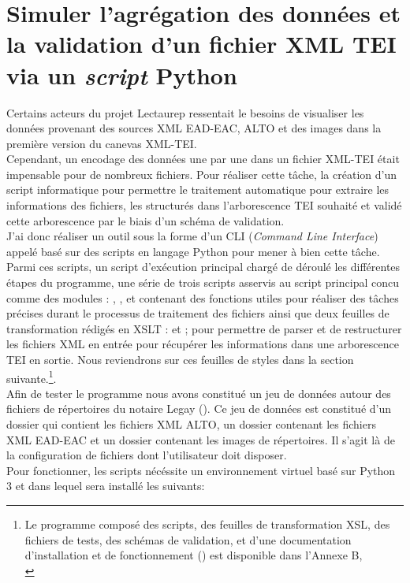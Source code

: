 \section{Simuler l'agrégation des données et la validation d'un fichier XML TEI via un \textit{script} Python}

Certains acteurs du projet Lectaurep ressentait le besoins de visualiser les données provenant des sources XML EAD-EAC, ALTO et des images dans la première version du canevas XML-TEI.\\

Cependant, un encodage  des données une par une dans un fichier XML-TEI était impensable pour de nombreux fichiers. Pour réaliser cette tâche, la création d'un script informatique pour permettre le traitement automatique pour extraire les informations des fichiers, les structurés dans l'arborescence TEI souhaité et validé cette arborescence par le biais d'un schéma de validation.\\

J'ai donc réaliser un outil sous la forme d'un CLI (\textit{Command Line Interface}) appelé  basé sur des scripts en langage Python pour mener à bien cette tâche. Parmi ces scripts, un script d'exécution principal  chargé de déroulé les différentes étapes du programme, une série de trois scripts asservis au script principal concu comme des modules : , , et  contenant des fonctions utiles pour réaliser des tâches précises durant le processus de traitement des fichiers ainsi que deux feuilles de transformation rédigés en XSLT :  et ; pour permettre de parser et de restructurer les fichiers XML en entrée pour récupérer les informations dans une arborescence TEI en sortie. Nous reviendrons sur ces feuilles de styles dans la section suivante.\footnote{Le programme composé des scripts, des feuilles de transformation XSL, des fichiers de tests, des schémas de validation, et d'une documentation d'installation et de fonctionnement  () est disponible dans l'Annexe B, \\
}.\\

Afin de tester le programme nous avons constitué un jeu de données autour des fichiers de répertoires du notaire Legay (). Ce jeu de données est constitué d'un dossier  qui contient les fichiers XML ALTO, un dossier  contenant les fichiers XML EAD-EAC et un dossier  contenant les images de répertoires. Il s'agit là de la configuration de fichiers dont l'utilisateur doit disposer.\\
\newpage
Pour fonctionner, les scripts nécéssite un environnement virtuel basé sur Python 3 et dans lequel sera installé les suivants:

